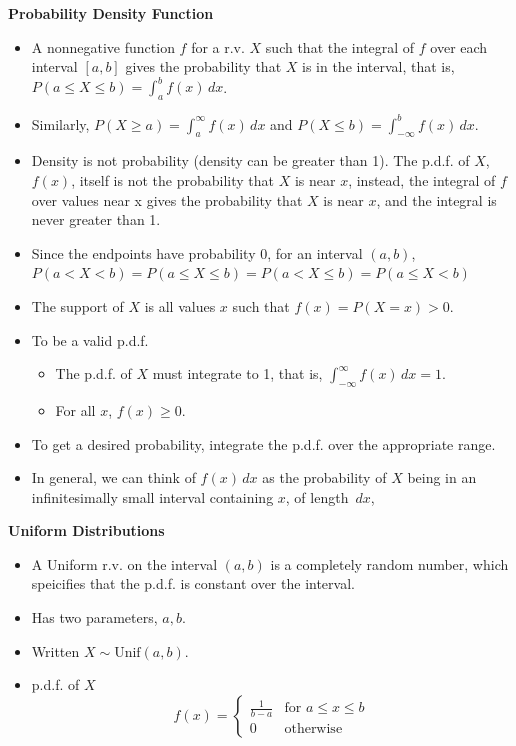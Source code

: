 \documentclass[11pt]{article}
\begin{document}
\textbf{Probability Density Function}
\begin{itemize}
    \item A nonnegative function $f$ for a r.v. $X$ such that the integral of $f$ over each 
    interval $[a,b]$ gives the probability that $X$ is in the interval, that is, $P(a \le X 
    \le b) = \int_{a}^{b} f(x) \,dx$.
    \item Similarly, $P(X \ge a) = \int_{a}^{\infty} f(x) \,dx$ and $P(X \le b) = \int_
    {-\infty}^{b} f(x) \,dx$.
    \item Density is not probability (density can be greater than 1). The p.d.f. of $X$, 
    $f(x)$, itself is not the probability that $X$ is near $x$, instead, the integral of $f$ 
    over values near x gives the probability that $X$ is near $x$, and the integral is never 
    greater than 1.
    \item Since the endpoints have probability 0, for an interval $(a,b)$, $P(a < X < b) = 
    P(a \le X \le b) = P(a < X \le b) =  P(a \le X < b)$
    \item The support of $X$ is all values $x$ such that $f(x)=P(X=x)>0$.
    \item To be a valid p.d.f.
    \begin{itemize}
        \item The p.d.f. of $X$ must integrate to 1, that is, $\int_{-\infty}^{\infty} f(x) \,dx=1$.
        \item For all $x$, $f(x) \ge 0$.
    \end{itemize}
    \item To get a desired probability, integrate the p.d.f. over the appropriate range.
    \item In general, we can think of $f(x) \,dx$ as the probability of $X$ being in an 
    infinitesimally small interval containing $x$, of length $\,dx$,
\end{itemize}

\textbf{Uniform Distributions}
\begin{itemize}
    \item A Uniform r.v. on the interval $(a,b)$ is a completely random number, which speicifies 
    that the p.d.f. is constant over the interval.
    \item Has two parameters, $a,b$.
    \item Written $X \sim \text{Unif}(a,b)$.
    \item p.d.f. of $X$
    \[ f(x) = \begin{cases} 
        \frac{1}{b-a} & \text{for } a \le x \le b \\
        0 & \text{otherwise}
     \end{cases}
  \]
\end{itemize}
\end{document}
